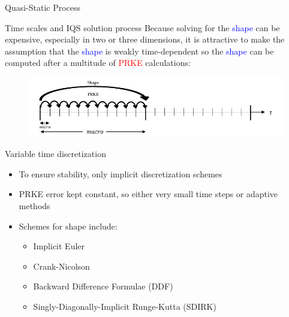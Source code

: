 \documentclass[8pt,xcolor=dvipnames]{beamer}
\newcommand{\tcr}[1]{\textcolor{red}{#1}}
\newcommand{\tcb}[1]{\textcolor{blue}{#1}}
\begin{document}
\begin{frame}{Quasi-Static Process}
\vspace{-2mm}

\begin{block}{Time scales and IQS solution process}
Because solving for the \tcb{shape} can be expensive, especially in two or three dimensions, it is attractive to make the assumption that the \tcb{shape} is weakly time-dependent so the \tcb{shape} can be computed after a multitude of \tcr{PRKE} calculations:
\begin{figure}
\includegraphics[width=\linewidth]{figures/IQS_visualization.jpg}
\end{figure}
\end{block}

\begin{block}{Variable time discretization}
\begin{itemize}
\item To ensure stability, only implicit discretization schemes
\item PRKE error kept constant, so either very small time steps or adaptive methods
\item Schemes for shape include:
\begin{itemize}
\item Implicit Euler
\item Crank-Nicolson
\item Backward Difference Formulae (DDF)
\item Singly-Diagonally-Implicit Runge-Kutta (SDIRK)
\end{itemize}
\end{itemize}
\end{block}

\end{frame}
\end{document}
